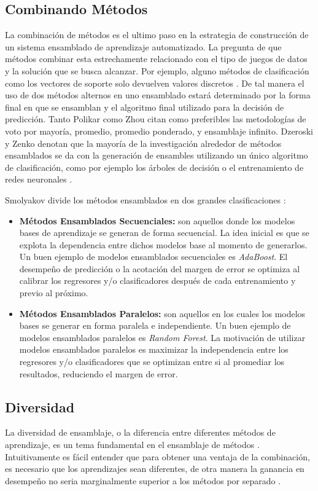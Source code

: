 \begin{spacing}{1.5}
\subsection{Combinando Métodos}
La combinación de métodos es el ultimo paso en la estrategia de construcción de un sistema ensamblado de aprendizaje automatizado. La pregunta de que métodos combinar esta estrechamente relacionado con el tipo de juegos de datos y la solución que se busca alcanzar. Por ejemplo, alguno métodos de clasificación como los vectores de soporte solo devuelven valores discretos \cite{ensembleMachineLearning}. De tal manera el uso de dos métodos alternos en uno ensamblado estará determinado por la forma final en que se ensamblan y el algoritmo final utilizado para la decisión de predicción. Tanto Polikar \cite{ensembleMachineLearning} como Zhou \cite{ensembleMethods} citan como preferibles las metodologías de voto por mayoría, promedio, promedio ponderado, y ensamblaje infinito. Dzeroski y Zenko denotan que la mayoría de la investigación alrededor de métodos ensamblados se da con la generación de ensambles utilizando un único algoritmo de clasificación, como por ejemplo los árboles de decisión o el entrenamiento de redes neuronales \cite{DzeroskiZenko}. 

Smolyakov divide los métodos ensamblados en dos grandes clasificaciones \cite{smolyakov}:

\begin{itemize}
  \item \textbf{Métodos Ensamblados Secuenciales:} son aquellos donde los modelos bases de aprendizaje se generan de forma secuencial. La idea inicial es que se explota la dependencia entre dichos modelos base al momento de generarlos. Un buen ejemplo de modelos ensamblados secuenciales es \emph{AdaBoost}. El desempeño de predicción o la acotación del margen de error se optimiza al calibrar los regresores y/o clasificadores después de cada entrenamiento y previo al próximo. 
  \item \textbf{Métodos Ensamblados Paralelos:} son aquellos en los cuales los modelos bases se generar en forma paralela e independiente. Un buen ejemplo de modelos ensamblados paralelos es \emph{Random Forest}. La motivación de utilizar modelos ensamblados paralelos es maximizar la independencia entre los regresores y/o clasificadores que se optimizan entre si al promediar los resultados, reduciendo el margen de error. 
\end{itemize}

\subsection{Diversidad}
La diversidad de ensamblaje, o la diferencia entre diferentes métodos de aprendizaje, es un tema fundamental en el ensamblaje de métodos \cite{ensembleMethods}. Intuitivamente es fácil entender que para obtener una ventaja de la combinación, es necesario que los aprendizajes sean diferentes, de otra manera la ganancia en desempeño no seria marginalmente superior a los métodos por separado \cite{ensembleMethods}.


\end{spacing}
